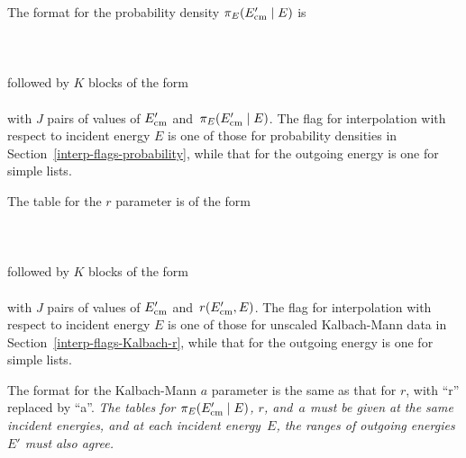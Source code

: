  The format for the probability density
 $\pi_E( E_{\text{cm}}' \mid E)$ is\\
   \\
  \\
  \\
followed by $K$ blocks of the form\\
 \\
with $J$ pairs of values of $E_{\text{cm}}'$ and~$\pi_E( E_{\text{cm}}' \mid E)$.
The flag for interpolation with respect to incident energy $E$ is
one of those for probability densities in Section~\ref{interp-flags-probability}, 
while that for the outgoing energy
is one for simple lists.

The table for the $r$ parameter is of the form\\
   \\
  \\
  \\
followed by $K$ blocks of the form\\
 \\
with $J$ pairs of values of $E_{\text{cm}}'$ and~$r( E_{\text{cm}}',  E)$.
The flag for interpolation with respect to incident energy $E$ is
one of those for unscaled Kalbach-Mann data in Section~\ref{interp-flags-Kalbach-r}, 
while that for the outgoing energy
is one for simple lists.

The format for the Kalbach-Mann $a$ parameter is the same as that for $r$,
with ``r'' replaced by ``a''.  \textit{The tables for $\pi_E( E_{\text{cm}}' \mid E)$, $r$,
and~$a$ must be given at the same incident energies, and at each
incident energy~$E$, the ranges of outgoing energies~$E'$ must also agree.}


